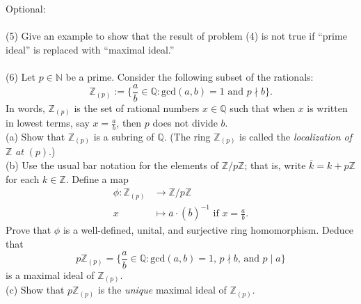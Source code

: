 \documentclass[12pt]{article}
\newcommand      {\N}         {{\mathbb N}}
\newcommand      {\Z}         {{\mathbb Z}}
\newcommand      {\Q}         {{\mathbb Q}}
\begin{document}
Optional:\\
\\
(5) Give an example to show that the result of problem (4) is not true if ``prime ideal'' is replaced with ``maximal ideal.''\\
\\
(6) Let $p\in\N$ be a prime. Consider the following subset of the rationals:
\begin{equation*}
	\Z_{(p)}:=\{\frac{a}{b}\in\Q:\text{gcd}(a,b)=1\text{ and }p\nmid b\}.
\end{equation*}
In words, $\Z_{(p)}$ is the set of rational numbers $x\in\Q$ such that when $x$ is written in lowest terms, say $x=\frac{a}{b}$, then $p$ does not divide $b$.\\
(a) Show that $\Z_{(p)}$ is a subring of $\Q$. (The ring $\Z_{(p)}$ is called the \textit{localization of }$\Z$\textit{ at }$(p)$.)\\
(b) Use the usual bar notation for the elements of $\Z/p\Z$; that is, write $\overline{k}=k+p\Z$ for each $k\in\Z$. Define a map
\begin{align*}
	\phi:\Z_{(p)}	&\to\Z/p\Z\\
	x		&\mapsto \overline{a}\cdot(\overline{b})^{-1}\text{ if }x=\frac{a}{b}.
\end{align*}
Prove that $\phi$ is a well-defined, unital, and surjective ring homomorphism. Deduce that
\begin{equation*}
	p\Z_{(p)}=\{\frac{a}{b}\in\Q:\text{gcd}(a,b)=1\text{, }p\nmid b\text{, and }p\mid a\}
\end{equation*}
is a maximal ideal of $\Z_{(p)}$.\\
(c) Show that $p\Z_{(p)}$ is the \textit{unique} maximal ideal of $\Z_{(p)}$.
\end{document}

